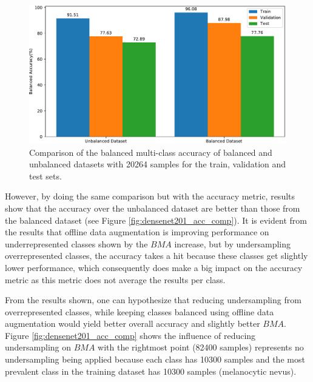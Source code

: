     \begin{figure}[ht]
        \centering
        \includegraphics[width=\textwidth]{figs/densenet201_bma_comp.pdf}
        \caption{Comparison of the balanced multi-class accuracy of balanced and unbalanced datasets with 20264 samples for the train, validation and test sets.}
        \label{fig:densenet201_bma_comp}
    \end{figure}
    
    However, by doing the same comparison but with the accuracy metric, results show that the accuracy over the unbalanced dataset are better than those from the balanced dataset (see Figure \ref{fig:densenet201_acc_comp}). It is evident from the results that offline data augmentation is improving performance on underrepresented classes shown by the $BMA$ increase, but by undersampling overrepresented classes, the accuracy takes a hit because these classes get slightly lower performance, which consequently does make a big impact on the accuracy metric as this metric does not average the results per class. \par
    
    From the results shown, one can hypothesize that reducing undersampling from overrepresented classes, while keeping classes balanced using offline data augmentation would yield better overall accuracy and slightly better $BMA$. Figure \ref{fig:densenet201_acc_comp} shows the influence of reducing undersampling on $BMA$ with the rightmost point (82400 samples) represents no undersampling being applied because each class has 10300 samples and the most prevalent class in the training dataset has 10300 samples (melanocytic nevus). \par
    
